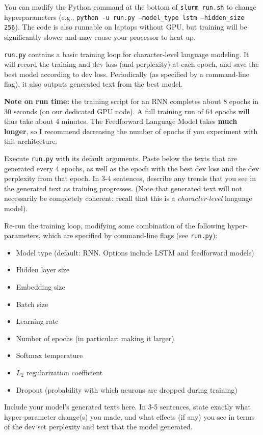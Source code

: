 \documentclass[11pt]{article}
\begin{document}
\noindent You can modify the Python command at the bottom of \texttt{slurm\_run.sh} to change hyperparameters (e.g., \texttt{python -u run.py --model\_type lstm --hidden\_size 256}). The code is also runnable on laptops without GPU, but training will be significantly slower and may cause your processor to heat up.

\texttt{run.py} contains a basic training loop for character-level language modeling. It will record the training and dev loss (and perplexity) at each epoch, and save the best model according to dev loss.  Periodically (as specified by a command-line flag), it also outputs generated text from the best model. 

\textbf{Note on run time:} the training script for an RNN completes about 8 epochs in 30 seconds (on our dedicated GPU node). A full training run of 64 epochs will thus take about 4 minutes. The Feedforward Language Model takes \textbf{much longer}, so I recommend decreasing the number of epochs if you experiment with this architecture.

\vspace{2em}
 Execute \texttt{run.py} with its default arguments.  Paste below the texts that are generated every 4 epochs, as well as the epoch with the best dev loss and the dev perplexity from that epoch. In 3-4 sentences, describe any trends that you see in the generated text as training progresses. (Note that generated text will not necessarily be completely coherent: recall that this is a \emph{character-level} language model).

\vspace{2em}
 Re-run the training loop, modifying some combination of the following hyper-parameters, which are specified by command-line flags (see \texttt{run.py}):
\begin{itemize}
  \item Model type (default: RNN. Options include LSTM and feedforward models)
  \item Hidden layer size
  \item Embedding size
  \item Batch size
  \item Learning rate
  \item Number of epochs (in particular: making it larger)
  \item Softmax temperature
  \item $L_2$ regularization coefficient
  \item Dropout (probability with which neurons are dropped during training)
\end{itemize}
Include your model's generated texts here. In 3-5 sentences, state exactly what hyper-parameter change(s) you made, and what effects (if any) you see in terms of the dev set perplexity and text that the model generated.
\end{document}
